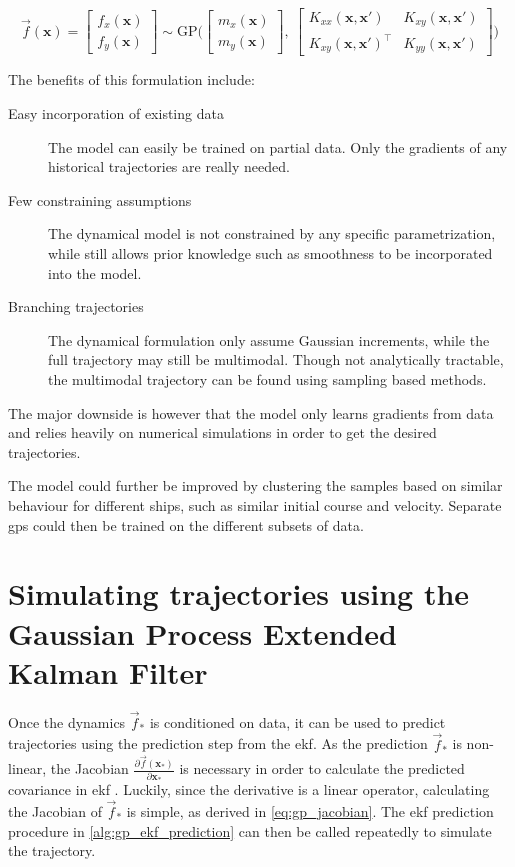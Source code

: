 \begin{equation}\label{eq:gp_vec_field}
    \vec{f}(\boldsymbol{x}) = \begin{bmatrix} f_x (\boldsymbol{x})\\ f_y (\boldsymbol{x})\end{bmatrix} \sim \text{GP} \big(\begin{bmatrix} m_x(\boldsymbol{x})\\m_y(\boldsymbol{x})\end{bmatrix}, \ \begin{bmatrix}
    K_{xx}(\boldsymbol{x}, \boldsymbol{x}') & K_{xy}(\boldsymbol{x}, \boldsymbol{x}') \\ K_{xy}(\boldsymbol{x}, \boldsymbol{x}')^\intercal & K_{yy}(\boldsymbol{x}, \boldsymbol{x}')
    \end{bmatrix}\big) 
\end{equation}

The benefits of this formulation include:
\begin{description}
    \item[Easy incorporation of existing data] The model can easily be trained on partial data. Only the gradients of any historical trajectories are really needed.
    \item[Few constraining assumptions] The dynamical model is not constrained by any specific parametrization, while still allows prior knowledge such as smoothness to be incorporated into the model.
    \item[Branching trajectories] The dynamical formulation only assume Gaussian increments, while the full trajectory may still be multimodal. Though not analytically tractable, the multimodal trajectory can be found using sampling based methods. 
\end{description}

The major downside is however that the model only learns gradients from data and relies heavily on numerical simulations in order to get the desired trajectories.

The model could further be improved by clustering the samples based on similar behaviour for different ships, such as similar initial course and velocity. Separate \acrshort{gp}s could then be trained on the different subsets of data.

\section{Simulating trajectories using the Gaussian Process Extended Kalman Filter}
Once the dynamics $\vec{f}_*$ is conditioned on data, it can be used to predict trajectories using the prediction step from the \acrshort{ekf}. As the prediction $\vec{f}_*$ is non-linear, the Jacobian $\frac{\partial \vec{f}(\boldsymbol{x}_*)}{\partial \boldsymbol{x}_*}$ is necessary in order to calculate the predicted covariance in \acrshort{ekf} \cite{gpekf}. Luckily, since the derivative is a linear operator, calculating the Jacobian of $\vec{f}_*$ is simple, as derived in \cref{eq:gp_jacobian}. The \acrshort{ekf} prediction procedure in \cref{alg:gp_ekf_prediction} can then be called repeatedly to simulate the trajectory. 

